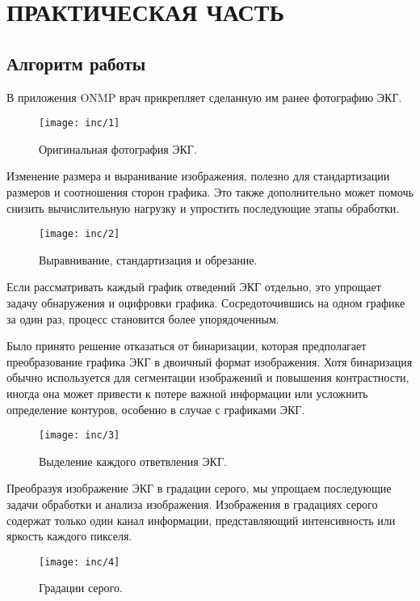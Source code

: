\section{ПРАКТИЧЕСКАЯ ЧАСТЬ}
\subsection{Алгоритм работы}

В приложения ONMP врач прикрепляет сделанную им ранее фотографию ЭКГ.
\begin{figure}
  \texttt{[image: inc/1]}
  \caption{Оригинальная фотография ЭКГ.}
  \label{fig:fig1}
\end{figure}

Изменение размера и выранивание изображения, полезно для стандартизации размеров и соотношения сторон графика. Это также дополнительно может помочь снизить вычислительную нагрузку и упростить последующие этапы обработки.

\begin{figure}
  \texttt{[image: inc/2]}
  \caption{Выравнивание, стандартизация и обрезание.}
  \label{fig:fig2}
\end{figure}

Если рассматривать каждый график отведений ЭКГ отдельно, это упрощает задачу обнаружения и оцифровки графика. Сосредоточившись на одном графике за один раз, процесс становится более упорядоченным.

Было принято решение отказаться от бинаризации, которая предполагает преобразование графика ЭКГ в двоичный формат изображения. Хотя бинаризация обычно используется для сегментации изображений и повышения контрастности, иногда она может привести к потере важной информации или усложнить определение контуров, особенно в случае с графиками ЭКГ.

\begin{figure}
  \texttt{[image: inc/3]}
  \caption{Выделение каждого ответвления ЭКГ.}
  \label{fig:fig3}
\end{figure}

Преобразуя изображение ЭКГ в градации серого, мы упрощаем последующие задачи обработки и анализа изображения. Изображения в градациях серого содержат только один канал информации, представляющий интенсивность или яркость каждого пикселя. 

\begin{figure}
  \texttt{[image: inc/4]}
  \caption{Градации серого.}
  \label{fig:fig4}
\end{figure}

